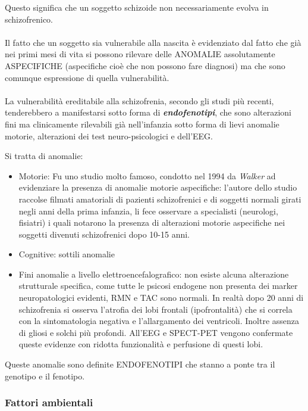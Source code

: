 Questo significa che un soggetto schizoide non necessariamente evolva in
schizofrenico.
\\\\
Il fatto che un soggetto sia vulnerabile alla nascita è evidenziato dal
fatto che già nei primi mesi di vita si possono rilevare delle ANOMALIE
assolutamente ASPECIFICHE (aspecifiche cioè che non possono fare
diagnosi) ma che sono comunque espressione di quella vulnerabilità.
\\\\
La vulnerabilità ereditabile alla schizofrenia, secondo gli studi più
recenti, tenderebbero a manifestarsi sotto forma di
\textbf{\emph{endofenotipi}}, che sono alterazioni fini ma clinicamente
rilevabili già nell'infanzia sotto forma di lievi anomalie motorie,
alterazioni dei test neuro-psicologici e dell'EEG.

Si tratta di anomalie:

\begin{itemize}
\item
  Motorie: Fu uno studio molto famoso, condotto nel 1994 da
  \emph{Walker} ad evidenziare la presenza di anomalie motorie
  aspecifiche: l'autore dello studio raccolse filmati amatoriali di
  pazienti schizofrenici e di soggetti normali girati negli anni della
  prima infanzia, li fece osservare a specialisti (neurologi, fisiatri)
  i quali notarono la presenza di alterazioni motorie aspecifiche nei
  soggetti divenuti schizofrenici dopo 10-15 anni.
\item
  Cognitive: sottili anomalie
\item
  Fini anomalie a livello elettroencefalografico: non esiste alcuna
  alterazione strutturale specifica, come tutte le psicosi endogene non
  presenta dei marker neuropatologici evidenti, RMN e TAC sono normali.
  In realtà dopo 20 anni di schizofrenia si osserva l'atrofia dei lobi
  frontali (ipofrontalità) che si correla con la sintomatologia negativa
  e l'allargamento dei ventricoli. Inoltre assenza di gliosi e solchi
  più profondi. All'EEG e SPECT-PET vengono confermate queste evidenze
  con ridotta funzionalità e perfusione di questi lobi.
\end{itemize}

Queste anomalie sono definite ENDOFENOTIPI che stanno a ponte tra il
genotipo e il fenotipo.

\subsubsection{Fattori ambientali}

